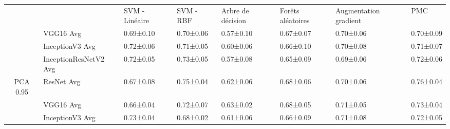 \begin{landscape}
\begin{table}[]
\begin{tabular}{clllllll}
\multicolumn{1}{l}{}        &                                    & SVM - Linéaire                             & SVM - RBF                         & Arbre de décision                 & Forêts aléatoires                 & Augmentation gradient             & PMC                               \\
                            & VGG16 Avg                          & 0.69±0.10                                  & 0.70±0.06                         & 0.57±0.10                         & 0.67±0.07                         & 0.70±0.06                         & 0.70±0.09                         \\
                            & InceptionV3 Avg                    & 0.72±0.06                                  & 0.71±0.05                         & 0.60±0.06                         & 0.66±0.10                         & 0.70±0.08                         & 0.71±0.07                         \\
                            & InceptionResNetV2 Avg              & 0.72±0.05                                  & 0.73±0.05                         & 0.57±0.08                         & 0.65±0.09                         & 0.69±0.06                         & 0.72±0.06                         \\
\multirow{-4}{*}{PCA 0.95}  & ResNet Avg                         & 0.67±0.08                                  & 0.75±0.04                         & 0.62±0.06                         & 0.68±0.06                         & 0.70±0.06                         & 0.76±0.04                         \\
                            & VGG16 Avg                          & 0.66±0.04                                  & 0.72±0.07                         & 0.63±0.02                         & 0.68±0.05                         & 0.71±0.05                         & 0.73±0.04                         \\
                            & InceptionV3 Avg                    & 0.73±0.04                                  & 0.68±0.02                         & 0.61±0.06                         & 0.66±0.09                         & 0.71±0.08                         & 0.72±0.05                         \\

\end{tabular}
\end{table}
\end{landscape}
